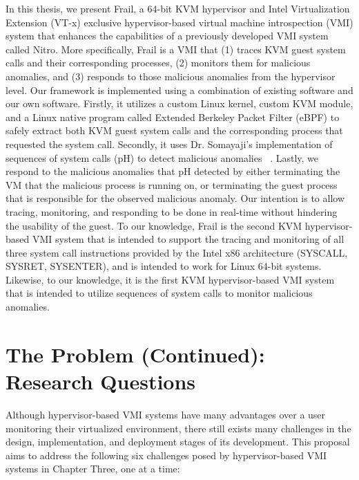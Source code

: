 \documentclass{report}
\begin{document}
\begin{spacing}{1.5}
{\large 
In this thesis, we present Frail, a 64-bit KVM hypervisor and Intel Virtualization Extension (VT-x) exclusive hypervisor-based virtual machine introspection (VMI) system that enhances the capabilities of a previously developed VMI system called Nitro. More specifically, Frail is a VMI that (1) traces KVM guest system calls and their corresponding processes, (2) monitors them for malicious anomalies, and (3) responds to those malicious anomalies from the hypervisor level. Our framework is implemented using a combination of existing software and our own software. Firstly, it utilizes a custom Linux kernel, custom KVM module, and a Linux native program called Extended Berkeley Packet Filter (eBPF) to safely extract both KVM guest system calls and the corresponding process that requested the system call. Secondly, it uses Dr. Somayaji's implementation of sequences of system calls (pH) to detect malicious anomalies ~\cite{somayaji2002operating}. Lastly, we respond to the malicious anomalies that pH detected by either terminating the VM that the malicious process is running on, or terminating the guest process that is responsible for the observed malicious anomaly. Our intention is to allow tracing, monitoring, and responding to be done in real-time without hindering the usability of the guest. To our knowledge, Frail is the second KVM hypervisor-based VMI system that is intended to support the tracing and monitoring of all three system call instructions provided by the Intel x86 architecture (SYSCALL, SYSRET, SYSENTER), and is intended to work for Linux 64-bit systems. Likewise, to our knowledge, it is the first KVM hypervisor-based VMI system that is intended to utilize sequences of system calls to monitor malicious anomalies.
\newline
}




\section{The Problem (Continued): Research Questions}

{\large
Although hypervisor-based VMI systems have many advantages over a user monitoring their virtualized environment, there still exists many challenges in the design, implementation, and deployment stages of its development. This proposal aims to address the following six challenges posed by hypervisor-based VMI systems in Chapter Three, one at a time:
\newline
}


\end{spacing}
\end{document}
